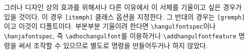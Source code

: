 \documentclass[
	12pt,
	a4paper,
	kosection,
	footnote,
	nobookmarks,
	microtype,
]{oblivoir}
\def\cs#1{\texttt{\textbackslash #1}}
\def\oblivoirdblquote#1{``#1''}
\newcommand\xobclass{x\-ob\-liv\-oir\oblivoirallowbreak}
\newcommand\obclass{ob\-liv\-oir\oblivoirallowbreak}
\def\xetexko{\XeTeX-\ko}
\begin{document}
그러나 디자인 상의 효과를 위해서나 다른 이유에서 
이 서체를 기울이고 싶은 경우가 있을 것이다.
이 경우 \texttt{[itemph]} 클래스 옵션을 지정한다.
그 반대의 경우는 \texttt{[gremph]}이고 이것이 디폴트이다. 부분부분 기울이려 한다면 \cs{hangulfontspec}이나
\cs{hanjafontspec}, 즉 \cs{adhochangulfont}를 이용하거나 \cs{addhangulfontfeature} 명령을 써서 조작할 수 있으므로 별도로 명령을 만들어두거나 하지 않았다.

%
%




\end{document}
